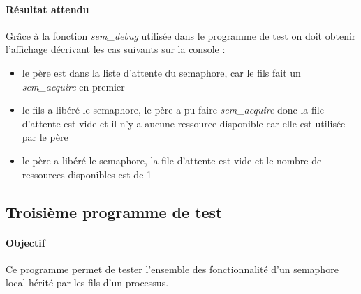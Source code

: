 \documentclass[12pt]{article}
\begin{document}
  \paragraph{Résultat attendu\\}
  Grâce à la fonction \textit{sem\_debug} utilisée dans le programme de test on doit obtenir l'affichage décrivant les cas suivants sur la console :
  \begin{itemize}
    \item le père est dans la liste d'attente du semaphore, car le fils fait un \textit{sem\_acquire} en premier
    \item le fils a libéré le semaphore, le père a pu faire \textit{sem\_acquire} donc la file d'attente est vide et il n'y a aucune ressource disponible car elle est utilisée par le père
    \item le père a libéré le semaphore, la file d'attente est vide et le nombre de ressources disponibles est de 1
  \end{itemize}

  \newpage
  \subsection{Troisième programme de test}
  \paragraph{Objectif\\}
  Ce programme permet de tester l'ensemble des fonctionnalité d'un semaphore local hérité par les fils d'un processus.
\end{document}

